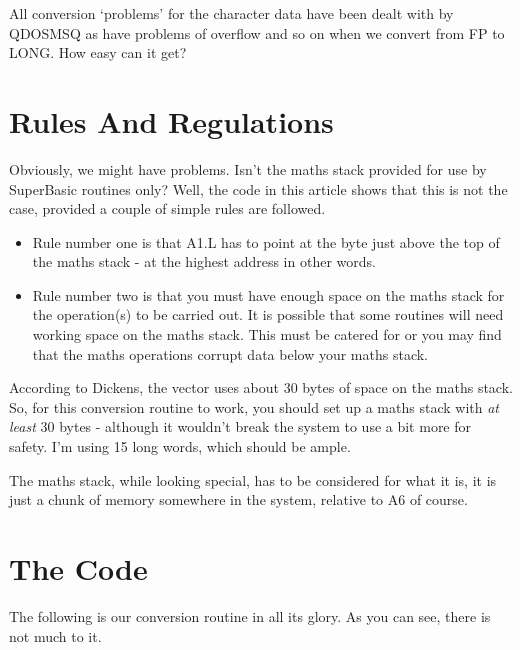 All conversion `problems' for the character data have been dealt with by
QDOSMSQ as have problems of overflow and so on when we convert from FP to LONG.
How easy can it get?

\section{Rules And Regulations}
\label{ch18-rules}%

Obviously, we might have problems. Isn't the maths stack
provided for use by SuperBasic routines only? Well, the code in this article
shows that this is not the case, provided a couple of simple rules are followed.
\begin{itemize}[itemsep=0pt]

\item{}Rule number one is that A1.L has to point at the byte just above the top of the
maths stack -{} at the highest address in other words.

\item{}Rule number two is that you must have enough space on the maths stack for the
operation(s) to be carried out. It is possible that some routines will need
working space on the maths stack. This must be catered for or you may find that
the maths operations corrupt data below your maths stack.

\end{itemize}

\begin{note}
According to Dickens, the  vector uses about 30 bytes of space on the
maths stack. So, for this conversion routine to work, you should set up a maths
stack with \emph{at least} 30 bytes -{} although it wouldn't break the system to use a
bit more for safety. I'm using 15 long words, which should be ample.
\end{note}

The maths stack, while looking special, has to be considered for what it is, it
is just a chunk of memory somewhere in the system, relative to A6 of course.

\section{The Code}
\label{ch18-code}%

The following is our conversion routine in all its glory. As you can see,
there is not much to it.

